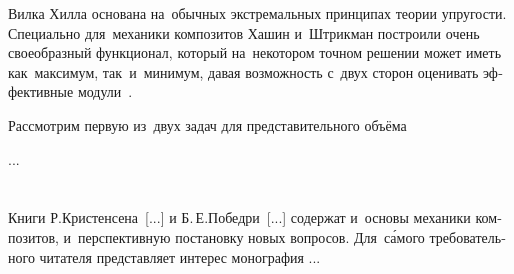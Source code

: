 \begin{otherlanguage}{russian}
Вилка Хилла основана на~обычных экстремальных принципах теории упругости. Специально для~механики композитов Хашин и~Штрикман построили очень своеобразный функционал, который на~некотором точном решении может иметь как~максимум, так~и~минимум, давая возможность с~двух сторон оценивать эффективные модули~\cite{shermergor}.

Рассмотрим первую из~двух задач для представительного объёма

...





\vspace{8mm}
\hfill\begin{minipage}[b]{0.95\linewidth}
\fontsize{10}{12}\selectfont

\section*{\wordforbibliography}

Книги Р.\:Кристенсена~[...] и Б.\,Е.\:Победри~[...] содержат и~основы механики композитов, и~перспективную постановку новых вопросов. Для~с\'{а}мого требовательного читателя представляет интерес монография ...

\end{minipage}

\end{otherlanguage}
